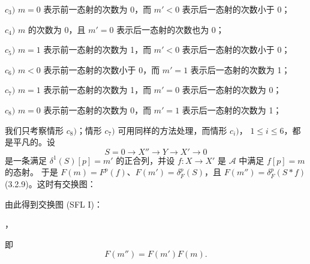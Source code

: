 \clearpage
{}%
\begingroup\small\setlength{\parskip}{0pt}\setlength{\emergencystretch}{1.5em}
\setlength{\abovedisplayskip}{4pt plus 2pt minus 2pt}%
\setlength{\belowdisplayskip}{4pt plus 2pt minus 2pt}%

\noindent$c_3)$ $m=0$ 表示前一态射的次数为 0，而 $m'<0$ 表示后一态射的次数小于 0；

\noindent$c_4)$ $m$ 的次数为 0，且 $m'=0$ 表示后一态射的次数也为 0；

\noindent$c_5)$ $m=1$ 表示前一态射的次数为 1，而 $m'<0$ 表示后一态射的次数小于 0；

\noindent$c_6)$ $m<0$ 表示前一态射的次数小于 0，而 $m'=1$ 表示后一态射的次数为 1；

\noindent$c_7)$ $m=1$ 表示前一态射的次数为 1，而 $m'=0$ 表示后一态射的次数为 0；

\noindent$c_8)$ $m=0$ 表示前一态射的次数为 0，而 $m'=1$ 表示后一态射的次数为 1；

我们只考察情形 $c_8)$；情形 $c_7)$ 可用同样的方法处理，而情形 $c_i)$，
$1\leq i\leq 6$，都是平凡的。设
\[
S=0\longrightarrow X''\longrightarrow Y\longrightarrow X'\longrightarrow0
\]
是一条满足 $\delta^1(S)[p]=m'$ 的正合列，并设
$f\colon X\longrightarrow X'$ 是 $\mathcal A$ 中满足 $f[p]=m$ 的态射。
于是 $F(m)=F^p(f)$、$F(m')=\delta_F^p(S)$，且
$F(m'')=\delta_F^p(S*f)$ (3.2.9)。这时有交换图：

\begin{center}
\end{center}
由此得到交换图 (SFL I)：

\begin{center}
\hspace{1em}，
\end{center}
即
\[
F(m'')=F(m')F(m).
\]

